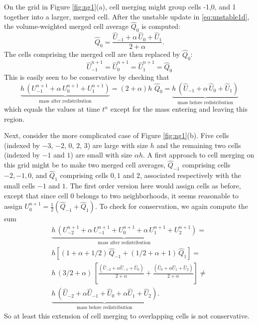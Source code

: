 On the grid in Figure \ref{fig:ng1}(a), cell merging might 
group cells -1,0, and 1 together into a larger, merged cell.
After the unstable update in \eqref{eq:unstable1d}, the  volume-weighted
merged cell average $\widehat{Q}_0$ is computed:
\begin{equation}
\widehat{Q}_0 = \frac{\widehat{U}_{-1} + \alpha \,  \widehat{U}_0 + 
\widehat{U}_1}{2+\alpha} .
\end{equation}
The cells comprising the merged cell
are then replaced by $\widehat{Q}_0$:
\begin{equation}
\widehat{U}_{-1}^{n+1} = \widehat{U}_0^{n+1} = \widehat{U}_1^{n+1} =
\widehat{Q}_0
\end{equation}
This is easily seen to be conservative by checking that
\begin{equation}
\underbrace{h \, (U_{-1}^{n+1} + \alpha \, U_0^{n+1} +
U_1^{n+1})}_{\text{mass after redistribution}}
= (2+\alpha) h \,  \, \widehat{Q}_0 =
\underbrace{ h \, (\widehat{U}_{-1} + \alpha \, \widehat{U}_{0} +
\widehat{U}_{1})}_{\text{mass before redistribution}}
\end{equation}
which equals the values at time $t^n$  except for the mass entering and
leaving this region.


Next, consider the more complicated case of Figure \ref{fig:ng1}(b).
Five cells (indexed by $-3$, $-2$, $0$, $2$, $3$) are large 
with size $h$ and the remaining two cells (indexed by $-1$ and $1$) 
are small with size $\alpha h$.
A first approach to cell merging on this grid
might be to make two merged cell averages, $\widehat{Q}_{-1}$
comprising cells ${-2},{-1},0$, and $\widehat{Q}_1$ comprising cells
$0, 1$ and $2$, associated respectively with the small cells $-1$ and $1$.
The first order version here would assign cells as before, except that
since cell 0 belongs to two neighborhoods, it seems  reasonable
to assign $U_0^{n+1} = \frac{1}{2} (\widehat{Q}_{-1} + \widehat{Q}_1).$  
To check for conservation, we again compute the sum
\begin{equation}
\begin{split}
\underbrace{h \, (U_{-2}^{n+1} + \alpha\,U_{-1}^{n+1} + U_0^{n+1} + \alpha \, U_1^{n+1}
+ U_2^{n+1})}_{\text{mass after redistribution}} = \\[.1in]
h \left [(1+\alpha +1/2) \, \widehat{Q}_{-1} +
 (1/2+\alpha +1) \, \widehat{Q}_{1}\right ]  = \\[.1in]
h \,  (3/2+\alpha) \, \left [ \frac{(\widehat{U}_{-2} + \alpha \widehat{U}_{-1} +
\widehat{U}_0)}{2+\alpha} +
        \frac{(\widehat{U}_{0} + \alpha \widehat{U}_{1} 
        + \widehat{U}_2)}{2+\alpha} \right ]  \neq \\[.08in]
\underbrace{h \,  ( \widehat{U}_{-2} + \alpha \widehat{U}_{-1} +
\widehat{U}_0 +  \alpha \widehat{U}_{1} + 
\widehat{U}_2 )}_{\text{mass before redistribution}}.  
\end{split}
\end{equation}
So at least this extension of cell merging to overlapping cells is not
conservative.

